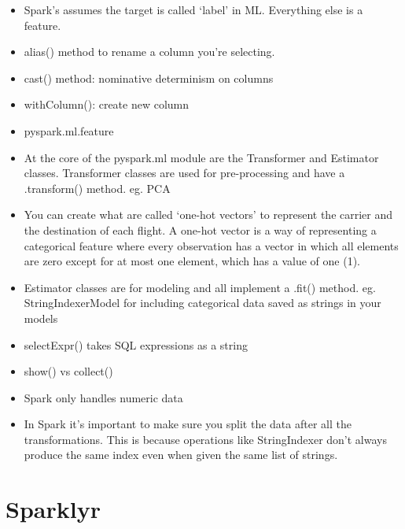 \documentclass[]{book}
\begin{document}
\begin{itemize}
\item
  Spark's assumes the target is called `label' in ML. Everything else is
  a feature.
\item
  alias() method to rename a column you're selecting.
\item
  cast() method: nominative determinism on columns
\item
  withColumn(): create new column
\item
  pyspark.ml.feature
\item
  At the core of the pyspark.ml module are the Transformer and Estimator
  classes. Transformer classes are used for pre-processing and have a
  .transform() method. eg. PCA
\item
  You can create what are called `one-hot vectors' to represent the
  carrier and the destination of each flight. A one-hot vector is a way
  of representing a categorical feature where every observation has a
  vector in which all elements are zero except for at most one element,
  which has a value of one (1).
\item
  Estimator classes are for modeling and all implement a .fit() method.
  eg. StringIndexerModel for including categorical data saved as strings
  in your models
\item
  selectExpr() takes SQL expressions as a string
\item
  show() vs collect()
\item
  Spark only handles numeric data
\item
  In Spark it's important to make sure you split the data after all the
  transformations. This is because operations like StringIndexer don't
  always produce the same index even when given the same list of
  strings.
\end{itemize}

\section{Sparklyr}\label{sparklyr}
\end{document}
